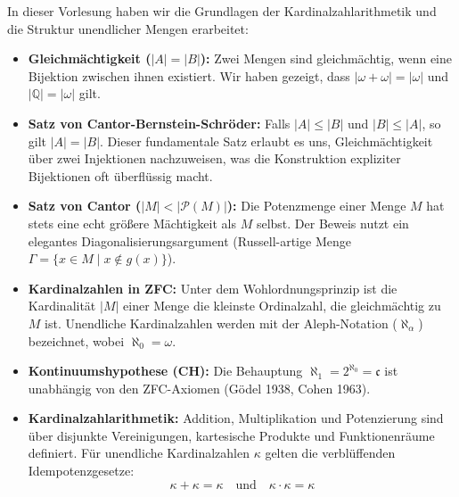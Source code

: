 \begin{nice-box}
In dieser Vorlesung haben wir die Grundlagen der Kardinalzahlarithmetik und die Struktur unendlicher Mengen erarbeitet:
\begin{itemize}
    \item \textbf{Gleichmächtigkeit ($|A| = |B|$):} Zwei Mengen sind gleichmächtig, wenn eine Bijektion zwischen ihnen existiert. Wir haben gezeigt, dass $|\omega + \omega| = |\omega|$ und $|\mathbb{Q}| = |\omega|$ gilt.
    \item \textbf{Satz von Cantor-Bernstein-Schröder:} Falls $|A| \le |B|$ und $|B| \le |A|$, so gilt $|A| = |B|$. Dieser fundamentale Satz erlaubt es uns, Gleichmächtigkeit über zwei Injektionen nachzuweisen, was die Konstruktion expliziter Bijektionen oft überflüssig macht.
    \item \textbf{Satz von Cantor ($|M| < |\mathcal{P}(M)|$):} Die Potenzmenge einer Menge $M$ hat stets eine echt größere Mächtigkeit als $M$ selbst. Der Beweis nutzt ein elegantes Diagonalisierungsargument (Russell-artige Menge $\Gamma = \{x \in M \mid x \notin g(x)\}$).
    \item \textbf{Kardinalzahlen in ZFC:} Unter dem Wohlordnungsprinzip ist die Kardinalität $|M|$ einer Menge die kleinste Ordinalzahl, die gleichmächtig zu $M$ ist. Unendliche Kardinalzahlen werden mit der Aleph-Notation ($\aleph_\alpha$) bezeichnet, wobei $\aleph_0 = \omega$.
    \item \textbf{Kontinuumshypothese (CH):} Die Behauptung $\aleph_1 = 2^{\aleph_0} = \mathfrak{c}$ ist unabhängig von den ZFC-Axiomen (Gödel 1938, Cohen 1963).
    \item \textbf{Kardinalzahlarithmetik:} Addition, Multiplikation und Potenzierung sind über disjunkte Vereinigungen, kartesische Produkte und Funktionenräume definiert. Für unendliche Kardinalzahlen $\kappa$ gelten die verblüffenden Idempotenzgesetze:
    \[
    \kappa + \kappa = \kappa \quad \text{und} \quad \kappa \cdot \kappa = \kappa
    \]
\end{itemize}
\end{nice-box}

